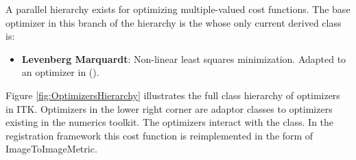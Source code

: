 A parallel hierarchy exists for optimizing multiple-valued cost functions. The
base optimizer in this branch of the hierarchy is the
 whose only current derived class
is:

\begin{itemize}

\item \textbf{Levenberg Marquardt}: Non-linear least squares minimization.
Adapted to an optimizer in  ().

\end{itemize}


Figure \ref{fig:OptimizersHierarchy} illustrates the full class hierarchy of
optimizers in ITK. Optimizers in the lower right corner are adaptor classes
to optimizers existing in the  numerics toolkit. The optimizers
interact with the  class. In the registration framework
this cost function is reimplemented in the form of ImageToImageMetric.





